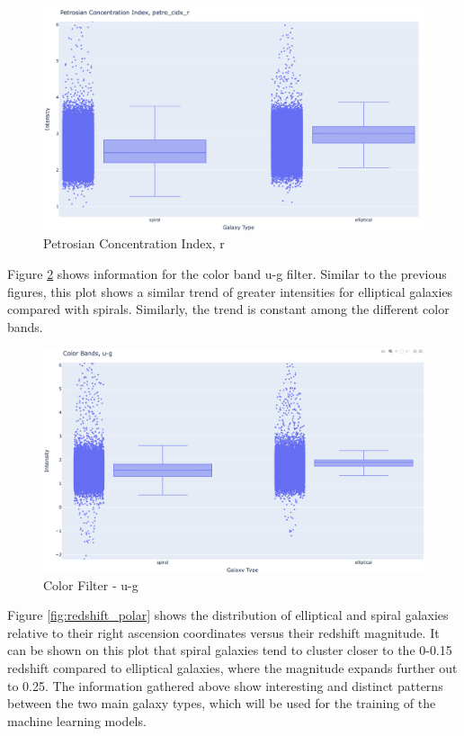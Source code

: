 \documentclass[11pt,sigconf]{acmart}
\begin{document}
\begin{figure}[htbp]
  \centering
  \includegraphics[scale=0.15]{petrosian_r}
  \caption{Petrosian Concentration Index, r}
  \label{fig:petrosian_r}
\end{figure}

Figure \ref{fig:ug_stat} shows information for the color band u-g filter. Similar to 
the previous figures, this plot shows a similar trend of greater intensities for 
elliptical galaxies compared with spirals. Similarly, the trend is constant among 
the different color bands.

\begin{figure}[htbp]
  \centering
  \includegraphics[scale=0.15]{ug_stat}
  \caption{Color Filter - u-g}
  \label{fig:ug_stat}
\end{figure}

Figure \ref{fig:redshift_polar} shows the distribution of elliptical and spiral galaxies 
relative to their right ascension coordinates versus their redshift magnitude. It can be 
shown on this plot that spiral galaxies tend to cluster closer to the 0-0.15 redshift 
compared to elliptical galaxies, where the magnitude expands further out to 0.25. The 
information gathered above show interesting and distinct patterns between the two main 
galaxy types, which will be used for the training of the machine learning models.
\end{document}
